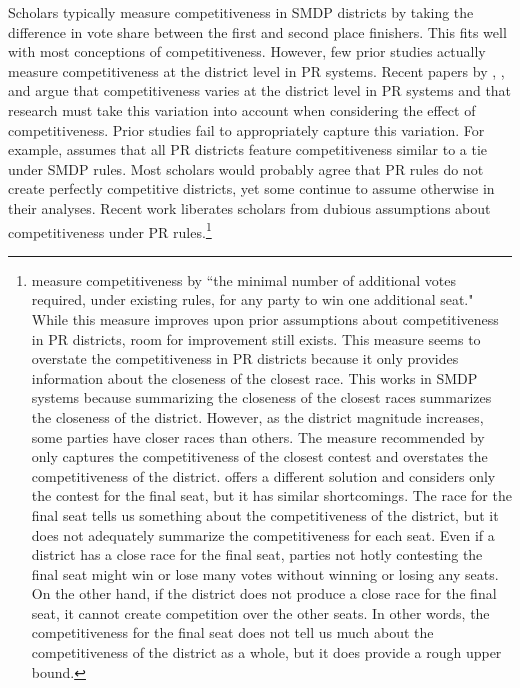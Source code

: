 \documentclass[12pt]{article}
\begin{document}
Scholars typically measure competitiveness in SMDP districts by taking the difference in vote share between the first and second place finishers. This fits well with most conceptions of competitiveness. However, few prior studies actually measure competitiveness at the district level in PR systems. Recent papers by \cite{BlaisLago2009}, \cite{GrofmanSelb2009}, and \cite{Selb2009} argue that competitiveness varies at the district level in PR systems and that research must take this variation into account when considering the effect of competitiveness. Prior studies fail to appropriately capture this variation. For example, \cite{Franklin2004} assumes that all PR districts feature competitiveness similar to a tie under SMDP rules. Most scholars would probably agree that PR rules do not create perfectly competitive districts, yet some continue to assume otherwise in their analyses. Recent work liberates scholars from dubious assumptions about competitiveness under PR rules.\footnote{\cite{BlaisLago2009} measure competitiveness by ``the minimal number of additional votes required, under existing rules, for any party to win one additional seat." While this measure improves upon prior assumptions about competitiveness in PR districts, room for improvement still exists. This measure seems to overstate the competitiveness in PR districts because it only provides information about the closeness of the closest race. This works in SMDP systems because summarizing the closeness of the closest races summarizes the closeness of the district. However, as the district magnitude increases, some parties have closer races than others. The measure recommended by \cite{BlaisLago2009} only captures the competitiveness of the closest contest and overstates the competitiveness of the district. \cite{Selb2009} offers a different solution and considers only the contest for the final seat, but it has similar shortcomings. The race for the final seat tells us something about the competitiveness of the district, but it does not adequately summarize the competitiveness for each seat. Even if a district has a close race for the final seat, parties not hotly contesting the final seat might win or lose many votes without winning or losing any seats. On the other hand, if the district does not produce a close race for the final seat, it cannot create competition over the other seats. In other words, the competitiveness for the final seat does not tell us much about the competitiveness of the district as a whole, but it does provide a rough upper bound.}
\end{document}
